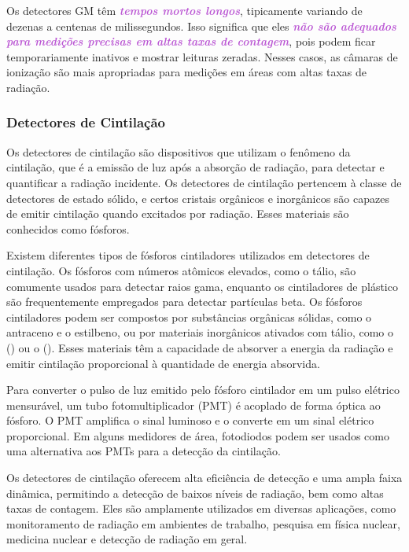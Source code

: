 \documentclass[11pt,a4paper]{article}
\begin{document}
	Os detectores GM têm \textcolor{MediumOrchid}{\textit{\textbf{tempos mortos longos}}}, tipicamente variando de dezenas a centenas de milissegundos. Isso significa que eles \textcolor{MediumOrchid}{\textit{\textbf{não são adequados para medições precisas em altas taxas de contagem}}}, pois podem ficar temporariamente inativos e mostrar leituras zeradas. Nesses casos, as câmaras de ionização são mais apropriadas para medições em áreas com altas taxas de radiação.

\subsubsection*{Detectores de Cintilação}

	Os detectores de cintilação são dispositivos que utilizam o fenômeno da cintilação, que é a emissão de luz após a absorção de radiação, para detectar e quantificar a radiação incidente. Os detectores de cintilação pertencem à classe de detectores de estado sólido, e certos cristais orgânicos e inorgânicos são capazes de emitir cintilação quando excitados por radiação. Esses materiais são conhecidos como fósforos.

	Existem diferentes tipos de fósforos cintiladores utilizados em detectores de cintilação. Os fósforos com números atômicos elevados, como o tálio, são comumente usados para detectar raios gama, enquanto os cintiladores de plástico são frequentemente empregados para detectar partículas beta.  Os fósforos cintiladores podem ser compostos por substâncias orgânicas sólidas, como o antraceno e o estilbeno, ou por materiais inorgânicos ativados com tálio, como o () ou o (). Esses materiais têm a capacidade de absorver a energia da radiação e emitir cintilação proporcional à quantidade de energia absorvida.

	Para converter o pulso de luz emitido pelo fósforo cintilador em um pulso elétrico mensurável, um tubo fotomultiplicador (PMT) é acoplado de forma óptica ao fósforo. O PMT amplifica o sinal luminoso e o converte em um sinal elétrico proporcional. Em alguns medidores de área, fotodiodos podem ser usados como uma alternativa aos PMTs para a detecção da cintilação.

	Os detectores de cintilação oferecem alta eficiência de detecção e uma ampla faixa dinâmica, permitindo a detecção de baixos níveis de radiação, bem como altas taxas de contagem. Eles são amplamente utilizados em diversas aplicações, como monitoramento de radiação em ambientes de trabalho, pesquisa em física nuclear, medicina nuclear e detecção de radiação em geral.
\end{document}
